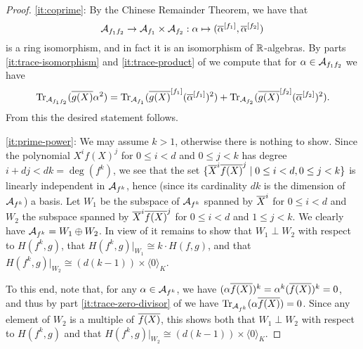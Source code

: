\documentclass[12pt, leqno, british]{amsart}
\begin{document}
\begin{proof}
\eqref{it:coprime}: By the Chinese Remainder Theorem, we have that $$ \mathcal{A}_{f_1f_2} \to \mathcal{A}_{f_1} \times \mathcal{A}_{f_2} : \alpha \mapsto (\overline{\alpha}^{[f_1]}, \overline{\alpha}^{[f_2]}) $$
is a ring isomorphism, and in fact it is an isomorphism of $\mathbb R$-algebras. By parts \eqref{it:trace-isomorphism} and \eqref{it:trace-product} of  we compute that for $\alpha \in \mathcal{A}_{f_1f_2}$ we have
$$ \operatorname{Tr}_{\mathcal{A}_{f_1f_2}}(\overline{g(X)}\alpha^2) = \operatorname{Tr}_{\mathcal{A}_{f_1}}(\overline{g(X)}^{[f_1]}(\overline{\alpha}^{[f_1]})^2) + \operatorname{Tr}_{\mathcal{A}_{f_2}}(\overline{g(X)}^{[f_2]}(\overline{\alpha}^{[f_2]})^2). $$
From this the desired statement follows.

\eqref{it:prime-power}: We may assume $k > 1$, otherwise there is nothing to show. 
Since the polynomial $X^i f(X)^j$ for $0 \leq i < d$ and $0 \leq j < k$ has degree $i + dj < dk = \deg(f^k)$, we see that the set $\lbrace \overline{X}^i \overline{f(X)}^j \mid 0 \leq i < d, 0 \leq j < k \rbrace$ is linearly independent in $\mathcal{A}_{f^k}$, hence (since its cardinality $dk$ is the dimension of $\mathcal{A}_{f^k}$) a basis.
Let $W_1$ be the subspace of $\mathcal{A}_{f^k}$ spanned by $\overline{X}^i$ for $0 \leq i < d$ and $W_2$ the subspace spanned by $\overline{X}^i\overline{f(X)}^j$ for $0 \leq i < d$ and $1 \leq j < k$.
We clearly have $\mathcal{A}_{f^k} = W_1 \oplus W_2$.
In view of  it remains to show that $W_1 \perp W_2$ with respect to $H(f^k, g)$, that $H(f^k, g)\vert_{W_1} \cong k \cdot H(f, g)$, and that $H(f^k, g)\vert_{W_2} \cong (d(k-1)) \times \langle 0 \rangle_K$.

To this end, note that, for any $\alpha \in \mathcal{A}_{f^k}$, we have $(\alpha \overline{f(X)})^{k} = \alpha^k (\overline{f(X)})^k = 0$, and thus by part \eqref{it:trace-zero-divisor} of  we have $\operatorname{Tr}_{\mathcal{A}_{f^k}}(\alpha\overline{f(X)}) = 0$.
Since any element of $W_2$ is a multiple of $\overline{f(X)}$, this shows both that $W_1 \perp W_2$ with respect to $H(f^k, g)$ and that $H(f^k, g)\vert_{W_2} \cong (d(k-1)) \times \langle 0 \rangle_K$.


\end{proof}
\end{document}

